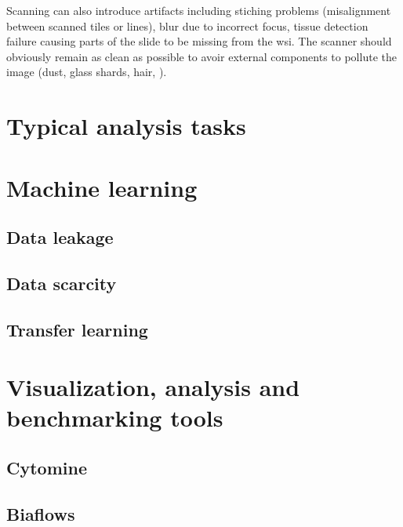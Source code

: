Scanning can also introduce artifacts including stiching problems (\ie misalignment between scanned tiles or lines), blur due to incorrect focus, tissue detection failure causing parts of the slide to be missing from the \acrshort{wsi}. The scanner should obviously remain as clean as possible to avoir external components to pollute the image (\eg dust, glass shards, hair, \etc). 

\section{Typical analysis tasks}
\label{sec:backdp:typicaltasks}

\section{Machine learning}
\label{sec:backdp:ml}



\subsection{Data leakage}
\label{ssec:backdp:dataleakage}

\subsection{Data scarcity}
\label{ssec:backdp:datascarcity}

\subsection{Transfer learning}
\label{ssec:backdp:tl}

\parencite{van2019strategies}

\section{Visualization, analysis and benchmarking tools}

\subsection{Cytomine}

\subsection{Biaflows}


